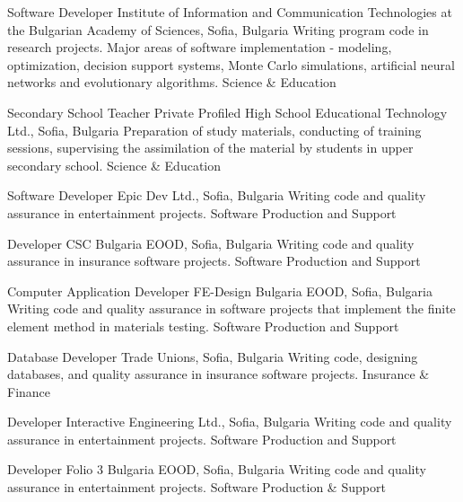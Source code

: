 \documentclass[english,a4paper]{europasscv}
\begin{document}
\begin{europasscv}
   {Software Developer}
  \ecvitem {} {Institute of Information and Communication Technologies at the Bulgarian Academy of Sciences, Sofia, Bulgaria}
  \ecvitem {} {Writing program code in research projects. Major areas of software implementation - modeling, optimization, decision support systems, Monte Carlo simulations, artificial neural networks and evolutionary algorithms.}
  \ecvitem {} { \quad Science \& Education}
  
   {Secondary School Teacher}
  \ecvitem {} {Private Profiled High School Educational Technology Ltd., Sofia, Bulgaria}
  \ecvitem {} {Preparation of study materials, conducting of training sessions, supervising the assimilation of the material by students in upper secondary school.}
  \ecvitem {} { \quad Science \& Education}
  
   {Software Developer}
  \ecvitem {} {Epic Dev Ltd., Sofia, Bulgaria}
  \ecvitem {} {Writing code and quality assurance in entertainment projects.}
  \ecvitem {} { \quad Software Production and Support}
  
   {Developer}
  \ecvitem {} {CSC Bulgaria EOOD, Sofia, Bulgaria}
  \ecvitem {} {Writing code and quality assurance in insurance software projects.}
  \ecvitem {} { \quad Software Production and Support}
  
   {Computer Application Developer}
  \ecvitem {} {FE-Design Bulgaria EOOD, Sofia, Bulgaria}
  \ecvitem {} {Writing code and quality assurance in software projects that implement the finite element method in materials testing.}
  \ecvitem {} { \quad Software Production and Support}
  
   {Database Developer}
  \ecvitem {} {Trade Unions, Sofia, Bulgaria}
  \ecvitem {} {Writing code, designing databases, and quality assurance in insurance software projects.}
  \ecvitem {} { \quad Insurance \& Finance}
  
   {Developer}
  \ecvitem {} {Interactive Engineering Ltd., Sofia, Bulgaria}
  \ecvitem {} {Writing code and quality assurance in entertainment projects.}
  \ecvitem {} { \quad Software Production and Support}
  
   {Developer}
  \ecvitem {} {Folio 3 Bulgaria EOOD, Sofia, Bulgaria}
  \ecvitem {} {Writing code and quality assurance in entertainment projects.}
  \ecvitem {} { \quad Software Production \& Support}
  

\end{europasscv}
\end{document}
